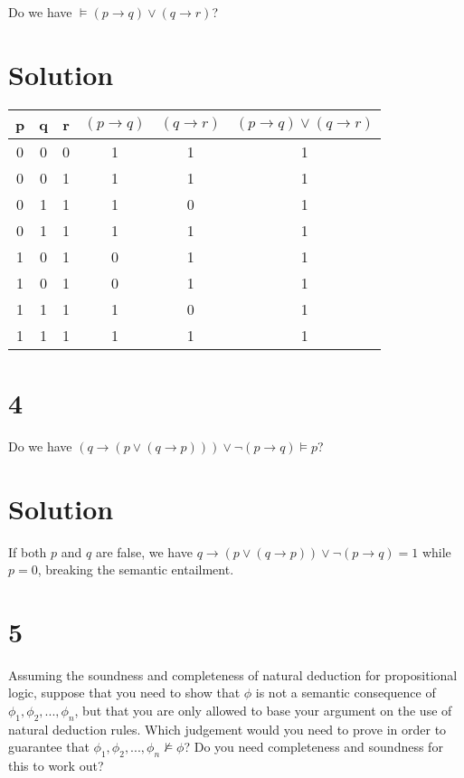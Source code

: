 \documentclass[10pt]{article}
\begin{document}
Do we have $\models (p \to q) \lor (q\to r)$?

\section*{Solution}


\begin{tabular}{ c | c | c | c | c || c }    
  p & q & r & $(p\to q)$ & $(q\to r)$ & $(p\to q)\lor (q\to r)$\\
  \hline
  0 & 0 & 0 & 1 & 1 & 1\\
  0 & 0 & 1 & 1 & 1 & 1\\
  0 & 1 & 1 & 1 & 0 & 1\\
  0 & 1 & 1 & 1 & 1 & 1\\
  1 & 0 & 1 & 0 & 1 & 1\\
  1 & 0 & 1 & 0 & 1 & 1\\
  1 & 1 & 1 & 1 & 0 & 1\\
  1 & 1 & 1 & 1 & 1 & 1\\
\end{tabular}

\section*{4}

Do we have $ (q\to (p\lor (q\to p))) \lor \lnot(p\to q) \models p$?

\section*{Solution}

If both $p$ and $q$ are false, we have $q\to (p \lor (q\to p)) \lor \lnot (p \to q) = 1$ while $p=0$, breaking the semantic entailment.

\section*{5}

Assuming the soundness and completeness of natural deduction for propositional logic, suppose that you need to show that $\phi$ is not a semantic consequence of $\phi _1, \phi _2, ..., \phi _n$, but that you are only allowed to base your argument on the use of natural deduction rules. Which judgement would you need to prove in order to guarantee that $\phi _1, \phi _2, ..., \phi _n \not\models \phi$? Do you need completeness and soundness for this to work out?
\end{document}
